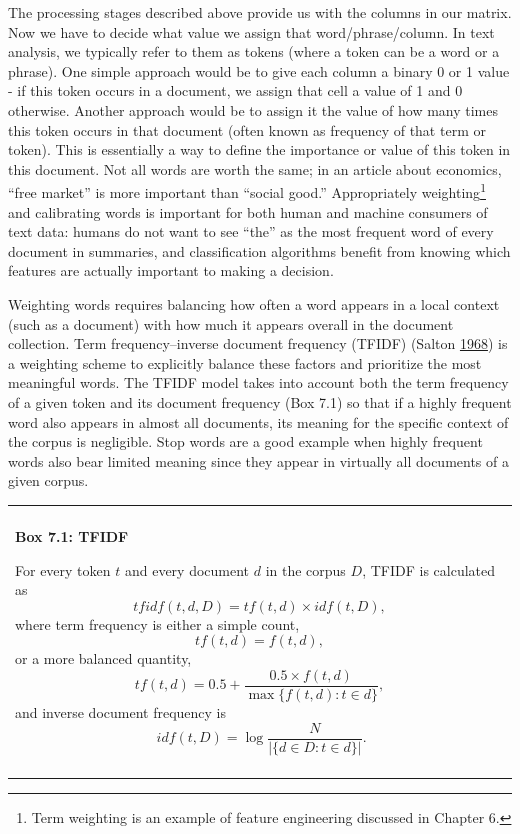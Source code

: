 \documentclass[]{krantz}
\newenvironment{F00}
    {\begin{center}
    \begin{tabular}{|p{0.9\textwidth}|}
    \hline\\
    }
    { 
    \\\\\hline
    \end{tabular} 
    \end{center}
    }
\begin{document}
The processing stages described above provide us with the columns in our
matrix. Now we have to decide what value we assign that
word/phrase/column. In text analysis, we typically refer to them as
tokens (where a token can be a word or a phrase). One simple approach
would be to give each column a binary 0 or 1 value - if this token
occurs in a document, we assign that cell a value of 1 and 0 otherwise.
Another approach would be to assign it the value of how many times this
token occurs in that document (often known as frequency of that term or
token). This is essentially a way to define the importance or value of
this token in this document. Not all words are worth the same; in an
article about economics, ``free market'' is more important than ``social
good.'' Appropriately weighting\footnote{Term weighting is an example of
  feature engineering discussed in Chapter 6.} and calibrating words is
important for both human and machine consumers of text data: humans do
not want to see ``the'' as the most frequent word of every document in
summaries, and classification algorithms benefit from knowing which
features are actually important to making a decision.

Weighting words requires balancing how often a word appears in a local
context (such as a document) with how much it appears overall in the
document collection. Term frequency--inverse document frequency (TFIDF)
(Salton \protect\hyperlink{ref-salton-68}{1968}) is a weighting scheme
to explicitly balance these factors and prioritize the most meaningful
words. The TFIDF model takes into account both the term frequency of a
given token and its document frequency (Box 7.1) so that if a highly
frequent word also appears in almost all documents, its meaning for the
specific context of the corpus is negligible. Stop words are a good
example when highly frequent words also bear limited meaning since they
appear in virtually all documents of a given corpus.

\begin{F00}
\textbf{Box 7.1: TFIDF}

For every token \(t\) and every document \(d\) in the corpus \(D\),
TFIDF is calculated as \[tfidf(t,d,D) = tf(t,d) \times
idf(t,D),\] where term frequency is either a simple count,
\[tf(t,d)=f(t,d),\] or a more balanced quantity,
\[tf(t,d) = 0.5+\frac{0.5 \times
  f(t,d)}{\max\{f(t,d):t\in d\}},\] and inverse document frequency is
\[\
idf(t,D) = \log\frac{N}{|\{d\in D:t\in d\}|}.\]
\end{F00}
\end{document}
